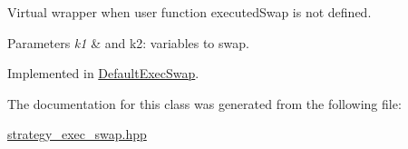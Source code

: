 \-Virtual wrapper when user function executed\-Swap is not defined. 


\begin{DoxyParams}{\-Parameters}
{\em k1} & and k2\-: variables to swap. \\
\hline
\end{DoxyParams}


\-Implemented in \hyperlink{classDefaultExecSwap_a97353521524f73e025572e1cab5b6b14}{\-Default\-Exec\-Swap}.



\-The documentation for this class was generated from the following file\-:\begin{DoxyCompactItemize}
\item 
\hyperlink{strategy__exec__swap_8hpp}{strategy\-\_\-exec\-\_\-swap.\-hpp}\end{DoxyCompactItemize}
